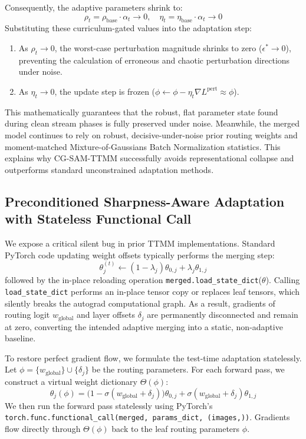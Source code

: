 \documentclass{article}
\theoremstyle{plain}
\theoremstyle{definition}
\theoremstyle{remark}
\begin{document}
Consequently, the adaptive parameters shrink to:
\begin{equation}
    \rho_t = \rho_{\text{base}} \cdot \alpha_t \to 0, \quad \eta_t = \eta_{\text{base}} \cdot \alpha_t \to 0
\end{equation}
Substituting these curriculum-gated values into the adaptation step:
\begin{enumerate}
    \item As $\rho_t \to 0$, the worst-case perturbation magnitude shrinks to zero ($\epsilon^* \to 0$), preventing the calculation of erroneous and chaotic perturbation directions under noise.
    \item As $\eta_t \to 0$, the update step is frozen ($\phi \leftarrow \phi - \eta_t \nabla L^{\text{pert}} \approx \phi$).
\end{enumerate}
This mathematically guarantees that the robust, flat parameter state found during clean stream phases is fully preserved under noise. Meanwhile, the merged model continues to rely on robust, decisive-under-noise prior routing weights and moment-matched Mixture-of-Gaussians Batch Normalization statistics. This explains why CG-SAM-TTMM successfully avoids representational collapse and outperforms standard unconstrained adaptation methods.

\subsection{Preconditioned Sharpness-Aware Adaptation with Stateless Functional Call}
We expose a critical silent bug in prior TTMM implementations. Standard PyTorch code updating weight offsets typically performs the merging step:
\begin{equation}
    \theta_j^{(t)} \leftarrow (1-\lambda_j)\theta_{0,j} + \lambda_j\theta_{1,j}
\end{equation}
followed by the in-place reloading operation \texttt{merged.load\_state\_dict}(\ensuremath{\theta}). Calling \texttt{load\_state\_dict} performs an in-place tensor copy or replaces leaf tensors, which silently breaks the autograd computational graph. As a result, gradients of routing logit $w_{\text{global}}$ and layer offsets $\delta_j$ are permanently disconnected and remain at zero, converting the intended adaptive merging into a static, non-adaptive baseline.

To restore perfect gradient flow, we formulate the test-time adaptation statelessly. Let $\phi = \{w_{\text{global}}\} \cup \{\delta_j\}$ be the routing parameters. For each forward pass, we construct a virtual weight dictionary $\Theta(\phi)$:
\begin{equation}\label{eq:virtual_weights}
    \theta_j(\phi) = \big(1 - \sigma(w_{\text{global}} + \delta_j)\big)\theta_{0, j} + \sigma(w_{\text{global}} + \delta_j)\theta_{1, j}
\end{equation}
We then run the forward pass statelessly using PyTorch's \texttt{torch.func.functional\_call(merged, params\_dict, (images,))}. Gradients flow directly through $\Theta(\phi)$ back to the leaf routing parameters $\phi$.
\end{document}
